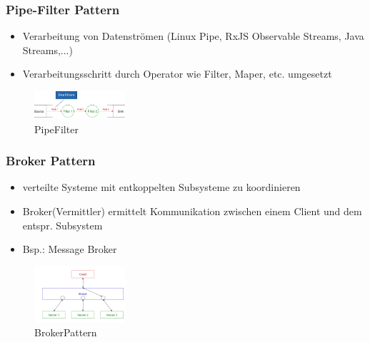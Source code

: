 \documentclass[../ZF_SWEN1.tex]{subfiles}
\begin{document}
\subsubsection{Pipe-Filter Pattern}

\begin{multicols}{2}
	\begin{itemize}
		\item Verarbeitung von Datenströmen (Linux Pipe, RxJS Observable Streams, Java Streams,...)
		\item Verarbeitungsschritt durch Operator wie Filter, Maper, etc. umgesetzt
	\end{itemize}
\columnbreak

\begin{figure}[H]			\includegraphics[width=0.3\textwidth] {Resources/Images/PipeFilter.png}
\caption{\label{fig:PipeFilter}PipeFilter}
\end{figure}

\end{multicols}


\subsubsection{Broker Pattern}
\begin{multicols}{2}
	\begin{itemize}
		\item verteilte Systeme mit entkoppelten Subsysteme zu koordinieren
		\item Broker(Vermittler) ermittelt Kommunikation zwischen einem Client und dem entspr. Subsystem
		\item Bsp.: Message Broker
	\end{itemize}
\columnbreak

\begin{figure}[H]			\includegraphics[width=0.3\textwidth] {Resources/Images/BrokerPattern.png}
\caption{\label{fig:BrokerPattern}BrokerPattern}
\end{figure}

\end{multicols}
\end{document}
